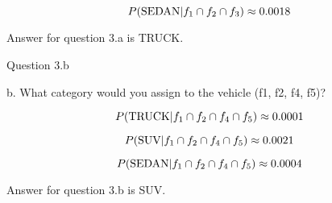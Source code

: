 \documentclass{article}
\begin{document}
\begin{equation}
	\nonumber P(\text{SEDAN}|f_1 \cap f_2 \cap f_3) \approx 0.0018
\end{equation}

Answer for question 3.a is TRUCK.

\begin{center} Question 3.b \end{center}

b. 	What category would you assign to the vehicle (f1, f2, f4, f5)?

\begin{equation}
	\nonumber P(\text{TRUCK}|f_1 \cap f_2 \cap f_4 \cap f_5) \approx 0.0001
\end{equation}

\begin{equation}
	\nonumber P(\text{SUV}|f_1 \cap f_2 \cap f_4 \cap f_5) \approx 0.0021
\end{equation}

\begin{equation}
	\nonumber P(\text{SEDAN}|f_1 \cap f_2 \cap f_4 \cap f_5) \approx 0.0004
\end{equation}

Answer for question 3.b is SUV.
\end{document}
